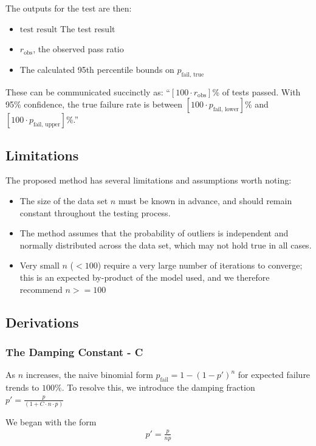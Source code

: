 The outputs for the test are then:
\begin{itemize}
    \item $\text{test result}$ The test result
    \item $r_\text{obs}$, the observed pass ratio
    \item The calculated 95th percentile bounds on $p_{\text{fail, true}}$
\end{itemize}

These can be communicated succinctly as:
``$[100 \cdot r_\text{obs}]\%$ of tests passed. With 95\% confidence, the true failure rate is between $[100 \cdot p_{\text{fail, lower}}]\%$ and $[100 \cdot p_{\text{fail, upper}}]\%$.''

\subsection{Limitations}

The proposed method has several limitations and assumptions worth noting: \begin{itemize}
    \item The size of the data set $n$ must be known in advance, and should remain constant throughout the testing process.
    \item The method assumes that the probability of outliers is independent and normally distributed across the data set, which may not hold true in all cases.
    \item Very small $n$ ($< 100$) require a very large number of iterations to converge; this is an expected by-product of the model used, and we therefore recommend $n >= 100$
\end{itemize}

\subsection{Derivations}\label{sec:derivations}

\subsubsection{The Damping Constant - C}\label{sec:derivation_c}

As $n$ increases, the naive binomial form $p_{\text{fail}} = 1 - (1 - p')^n$ for expected failure trends to $100\%$. 
To resolve this, we introduce the damping fraction $p' = \frac{p}{(1 + C \cdot n \cdot p)}$

We began with the form 
\begin{align}
    p' = \frac{p}{n \dot p}
\end{align}

